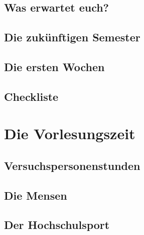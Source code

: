 \documentclass[12pt, a4paper]{article}
\newif\ifinfo
\begin{document}
\else
	


	\subsection{Was erwartet euch?}
	

	\subsection{Die zukünftigen Semester}
	

	\pagebreak

	\subsection{Die ersten Wochen}
	
\fi


\pagebreak

\subsection{Checkliste}



\pagebreak
\section{Die Vorlesungszeit}
\ifinfo
	\subsection{Der Stundenplan}
	
	
\else
	\subsection{Versuchspersonenstunden}
	
\fi

\subsection{Die Mensen}


\subsection{Der Hochschulsport}

\end{document}
